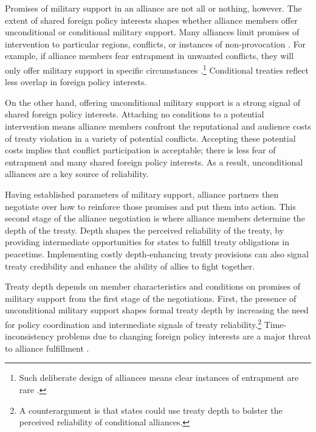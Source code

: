 \documentclass[12pt]{article}
\begin{document}
Promises of military support in an alliance are not all or nothing, however. 
The extent of shared foreign policy interests shapes whether alliance members offer unconditional or conditional military support.
Many alliances limit promises of intervention to particular regions, conflicts, or instances of non-provocation \citep{Leedsetal2000}. 
For example, if alliance members fear entrapment in unwanted conflicts, they will only offer military support in specific circumstances \citep{Kim2011, Benson2012}.\footnote{Such deliberate design of alliances means clear instances of entrapment are rare \citep{Beckley2015}.} 
Conditional treaties reflect less overlap in foreign policy interests. 


On the other hand, offering unconditional military support is a strong signal of shared foreign policy interests. 
Attaching no conditions to a potential intervention means alliance members confront the reputational \citep{Gibler2008, Crescenzietal2012} and audience \citep{Fearon1997} costs of treaty violation in a variety of potential conflicts. 
Accepting these potential costs implies that conflict participation is acceptable; there is less fear of entrapment and many shared foreign policy interests. 
As a result, unconditional alliances are a key source of reliability. 


Having established parameters of military support, alliance partners then negotiate over how to reinforce those promises and put them into action. 
This second stage of the alliance negotiation is where alliance members determine the depth of the treaty. 
Depth shapes the perceived reliability of the treaty, by providing intermediate opportunities for states to fulfill treaty obligations in peacetime. 
Implementing costly depth-enhancing treaty provisions can also signal treaty credibility and enhance the ability of allies to fight together. 


Treaty depth depends on member characteristics and conditions on promises of military support from the first stage of the negotiations.
First, the presence of unconditional military support shapes formal treaty depth by increasing the need for policy coordination and intermediate signals of treaty reliability.\footnote{A counterargument is that states could use treaty depth to bolster the perceived reliability of conditional alliances.}
Time-inconsistency problems due to changing foreign policy interests are a major threat to alliance fulfillment \citep{LeedsSavun2007}. 
\end{document}
